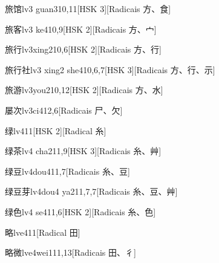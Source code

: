 \begin{entry}{旅馆}{lv3 guan3}{10,11}[HSK 3][Radicais ⽅、⾷]
\end{entry}

\begin{entry}{旅客}{lv3 ke4}{10,9}[HSK 2][Radicais ⽅、⼧]
\end{entry}

\begin{entry}{旅行}{lv3xing2}{10,6}[HSK 2][Radicais ⽅、⾏]
\end{entry}

\begin{entry}{旅行社}{lv3 xing2 she4}{10,6,7}[HSK 3][Radicais ⽅、⾏、⽰]
\end{entry}

\begin{entry}{旅游}{lv3you2}{10,12}[HSK 2][Radicais ⽅、⽔]
\end{entry}

\begin{entry}{屡次}{lv3ci4}{12,6}[Radicais ⼫、⽋]
\end{entry}

\begin{entry}{绿}{lv4}{11}[HSK 2][Radical ⽷]
\end{entry}

\begin{entry}{绿茶}{lv4 cha2}{11,9}[HSK 3][Radicais ⽷、⾋]
\end{entry}

\begin{entry}{绿豆}{lv4dou4}{11,7}[Radicais ⽷、⾖]
\end{entry}

\begin{entry}{绿豆芽}{lv4dou4 ya2}{11,7,7}[Radicais ⽷、⾖、⾋]
\end{entry}

\begin{entry}{绿色}{lv4 se4}{11,6}[HSK 2][Radicais ⽷、⾊]
\end{entry}

\begin{entry}{略}{lve4}{11}[Radical ⽥]
\end{entry}

\begin{entry}{略微}{lve4wei1}{11,13}[Radicais ⽥、⼻]
\end{entry}


